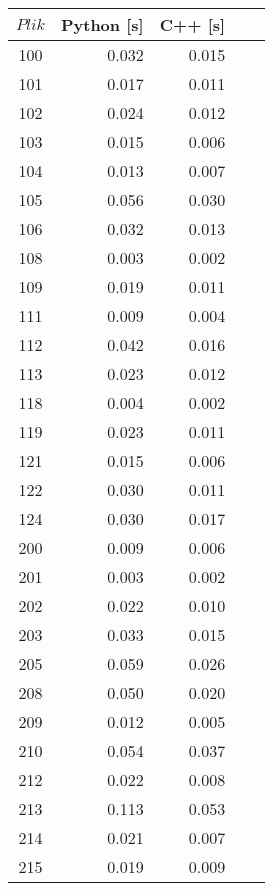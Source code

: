 \begin{table}
	\centering
	\begin{tabular}{|c|r|r|r|r|}
		\hline
		$Plik$ & Python [s] & C++ [s] \\
		\hline
		100 & 0.032      & 0.015      \\
		\hline
		101 & 0.017      & 0.011      \\
		\hline
		102 & 0.024      & 0.012      \\
		\hline
		103 & 0.015      & 0.006      \\
		\hline
		104 & 0.013      & 0.007      \\
		\hline
		105 & 0.056      & 0.030      \\
		\hline
		106 & 0.032      & 0.013      \\
		\hline
		108 & 0.003      & 0.002      \\
		\hline
		109 & 0.019      & 0.011      \\
		\hline
		111 & 0.009      & 0.004      \\
		\hline
		112 & 0.042      & 0.016      \\
		\hline
		113 & 0.023      & 0.012      \\
		\hline
		118 & 0.004      & 0.002      \\
		\hline
		119 & 0.023      & 0.011      \\
		\hline
		121 & 0.015      & 0.006      \\
		\hline
		122 & 0.030      & 0.011      \\
		\hline
		124 & 0.030      & 0.017      \\
		\hline
		200 & 0.009      & 0.006      \\
		\hline
		201 & 0.003      & 0.002      \\
		\hline
		202 & 0.022      & 0.010      \\
		\hline
		203 & 0.033      & 0.015      \\
		\hline
		205 & 0.059      & 0.026      \\
		\hline
		208 & 0.050      & 0.020      \\
		\hline
		209 & 0.012      & 0.005      \\
		\hline
		210 & 0.054      & 0.037      \\
		\hline
		212 & 0.022      & 0.008      \\
		\hline
		213 & 0.113      & 0.053      \\
		\hline
		214 & 0.021      & 0.007      \\
		\hline
		215 & 0.019      & 0.009      \\

\end{tabular}
\end{table}
